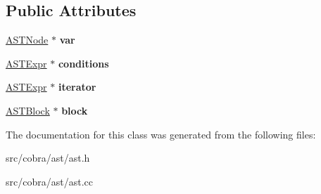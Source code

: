\subsection*{Public Attributes}
\begin{DoxyCompactItemize}
\item 
\hypertarget{class_cobra_1_1internal_1_1_a_s_t_for_a61962164f3d93fc5d680090b056ff8b7}{\hyperlink{class_cobra_1_1internal_1_1_a_s_t_node}{A\+S\+T\+Node} $\ast$ {\bfseries var}}\label{class_cobra_1_1internal_1_1_a_s_t_for_a61962164f3d93fc5d680090b056ff8b7}

\item 
\hypertarget{class_cobra_1_1internal_1_1_a_s_t_for_ae895f2e05ca9372a84c5ddeb75742386}{\hyperlink{class_cobra_1_1internal_1_1_a_s_t_expr}{A\+S\+T\+Expr} $\ast$ {\bfseries conditions}}\label{class_cobra_1_1internal_1_1_a_s_t_for_ae895f2e05ca9372a84c5ddeb75742386}

\item 
\hypertarget{class_cobra_1_1internal_1_1_a_s_t_for_aabc648bff8efded5efdfeb4e386b40fa}{\hyperlink{class_cobra_1_1internal_1_1_a_s_t_expr}{A\+S\+T\+Expr} $\ast$ {\bfseries iterator}}\label{class_cobra_1_1internal_1_1_a_s_t_for_aabc648bff8efded5efdfeb4e386b40fa}

\item 
\hypertarget{class_cobra_1_1internal_1_1_a_s_t_for_a2e7a7694dc5527a8936305e70e7438ed}{\hyperlink{class_cobra_1_1internal_1_1_a_s_t_block}{A\+S\+T\+Block} $\ast$ {\bfseries block}}\label{class_cobra_1_1internal_1_1_a_s_t_for_a2e7a7694dc5527a8936305e70e7438ed}

\end{DoxyCompactItemize}


The documentation for this class was generated from the following files\+:\begin{DoxyCompactItemize}
\item 
src/cobra/ast/ast.\+h\item 
src/cobra/ast/ast.\+cc\end{DoxyCompactItemize}
